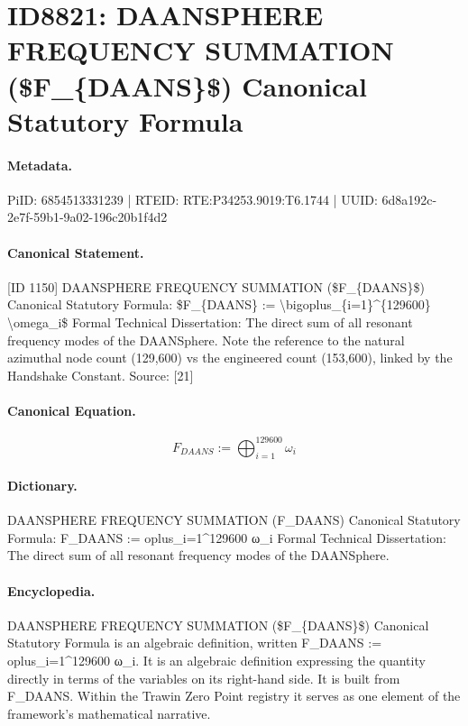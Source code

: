 \section*{ID8821: DAANSPHERE FREQUENCY SUMMATION (\$F\_\{DAANS\}\$) Canonical Statutory Formula}
\paragraph{Metadata.}
PiID: 6854513331239 | RTEID: RTE:P34253.9019:T6.1744 | UUID: 6d8a192c-2e7f-59b1-9a02-196c20b1f4d2

\paragraph{Canonical Statement.}
[ID 1150] DAANSPHERE FREQUENCY SUMMATION (\$F\_\{DAANS\}\$) Canonical Statutory Formula: \$F\_\{DAANS\} := \textbackslash{}bigoplus\_\{i=1\}\textasciicircum{}\{129600\} \textbackslash{}omega\_i\$ Formal Technical Dissertation: The direct sum of all resonant frequency modes of the DAANSphere. Note the reference to the natural azimuthal node count (129,600) vs the engineered count (153,600), linked by the Handshake Constant. Source: [21]

\paragraph{Canonical Equation.}
\[
F_{DAANS} := \bigoplus_{i=1}^{129600} \omega_i
\]

\paragraph{Dictionary.}
DAANSPHERE FREQUENCY SUMMATION (F\_DAANS) Canonical Statutory Formula: F\_DAANS := oplus\_i=1\textasciicircum{}129600 ω\_i Formal Technical Dissertation: The direct sum of all resonant frequency modes of the DAANSphere.

\paragraph{Encyclopedia.}
DAANSPHERE FREQUENCY SUMMATION (\$F\_\{DAANS\}\$) Canonical Statutory Formula is an algebraic definition, written F\_DAANS := oplus\_i=1\textasciicircum{}129600 ω\_i. It is an algebraic definition expressing the quantity directly in terms of the variables on its right-hand side. It is built from F\_DAANS. Within the Trawin Zero Point registry it serves as one element of the framework's mathematical narrative.

